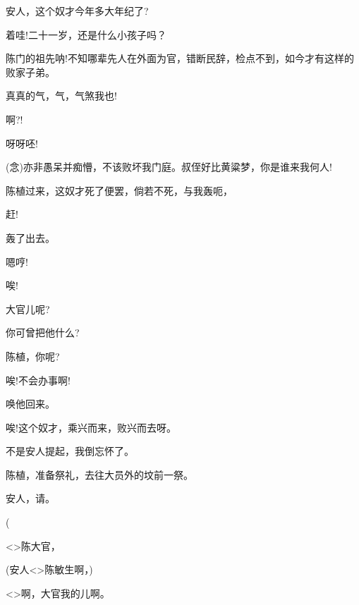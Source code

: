{安人，这个奴才今年多大年纪了?

着哇!二十一岁，还是什么小孩子吗？

陈门的祖先呐!不知哪辈先人在外面为官，错断民辞，检点不到，如今才有这样的败家子弟。

真真的气，气，气煞我也!

啊?!

呀呀呸!

({\akai 念})亦非愚呆并痴懵，不该败坏我门庭。叔侄好比黄粱梦，你是谁来我何人!

陈植过来，这奴才死了便罢，倘若不死，与我轰呃，

赶!

轰了出去。

嗯哼!


唉!


大官儿呢?

你可曾把他什么?

陈植，你呢?

唉!不会办事啊!

唤他回来。

唉!这个奴才，乘兴而来，败兴而去呀。

不是安人提起，我倒忘怀了。

陈植，准备祭礼，去往大员外的坟前一祭。

安人，请。


(



\textless{}\!\textgreater{}陈大官，

(安人\hspace{30pt}\textless{}\!\textgreater{}陈敏生啊，)

\textless{}\!\textgreater{}啊，大官我的儿啊。

}
